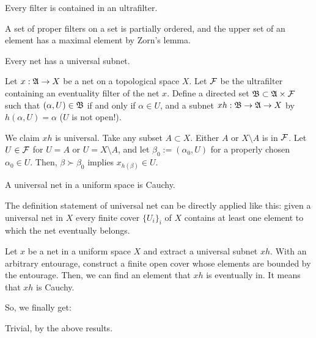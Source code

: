 \documentclass{../exp}
\begin{document}
\begin{thm}
Every filter is contained in an ultrafilter.
\end{thm}
\begin{pf}
A set of proper filters on a set is partially ordered, and the upper set of an element has a maximal element by Zorn's lemma.
\end{pf}

\begin{thm}
Every net has a universal subnet.
\end{thm}
\begin{pf}
Let $x:\fA\to X$ be a net on a topological space $X$.
Let $\mathcal{F}$ be the ultrafilter containing an eventuality filter of the net $x$.
Define a directed set $\mathfrak{B}\subset\mathfrak{A}\times\mathcal{F}$ such that $(\alpha,U)\in\mathfrak{B}$ if and only if $\alpha\in U$, and a subnet $xh:\fB\to\fA\to X$ by $h(\alpha,U)=\alpha$ ($U$ is not open!).

We claim $xh$ is universal.
Take any subset $A\subset X$.
Either $A$ or $X\setminus A$ is in $\mathcal{F}$.
Let $U\in\mathcal{F}$ for $U=A$ or $U=X\setminus A$, and let $\beta_0:=(\alpha_0,U)$ for a properly chosen $\alpha_0\in U$.
Then, $\beta\succ\beta_0$ implies $x_{h(\beta)}\in U$.
\end{pf}

\begin{thm}
A universal net in a uniform space is Cauchy.
\end{thm}
\begin{pf}
The definition statement of universal net can be directly applied like this: given a universal net in $X$ every finite cover $\{U_i\}_i$ of $X$ contains at least one element to which the net eventually belongs.

Let $x$ be a net in a uniform space $X$ and extract a universal subnet $xh$.
With an arbitrary entourage, construct a finite open cover whose elements are bounded by the entourage.
Then, we can find an element that $xh$ is eventually in.
It means that $xh$ is Cauchy.
\end{pf}

So, we finally get:
\begin{pf}[3 of Theorem 1.1]
Trivial, by the above results.
\end{pf}



\end{document}
